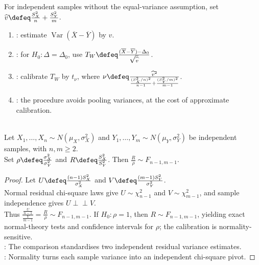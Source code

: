 \begin{method} \label{meth:welch-two-sample-test} \\
For independent samples without the equal-variance assumption, set $\widehat{v}\defeq \frac{S_X^2}{n}+\frac{S_Y^2}{m}$.
\begin{enumerate}[label=(\roman*)]
\setlength{\itemsep}{0pt}
\item {}: estimate $\operatorname{Var}(\overline{X}-\overline{Y})$ by $\widehat{v}$.
\item {}: for $H_0:\Delta=\Delta_0$, use $T_W\defeq\frac{(\overline{X}-\overline{Y})-\Delta_0}{\sqrt{\widehat{v}}}$.
\item {}: calibrate $T_W$ by $t_\nu$, where $\nu\defeq\frac{\widehat{v}^2}{\frac{(S_X^2/n)^2}{n-1}+\frac{(S_Y^2/m)^2}{m-1}}$.
\item {}: the procedure avoids pooling variances, at the cost of approximate calibration.
\end{enumerate}
\end{method}

\begin{corollary} \label{cor:two-normal-sample-variance-ratio-f} \\
Let $X_1,\ldots,X_n\sim N(\mu_X,\sigma_X^2)$ and $Y_1,\ldots,Y_m\sim N(\mu_Y,\sigma_Y^2)$ be independent samples, with $n,m\geq2$.\\
Set $\rho\defeq\frac{\sigma_X^2}{\sigma_Y^2}$ and $R\defeq \frac{S_X^2}{S_Y^2}$. Then $\frac{R}{\rho}\sim F_{n-1,m-1}$.
\begin{proof} Let $U\defeq\frac{(n-1)S_X^2}{\sigma_X^2}$ and $V\defeq\frac{(m-1)S_Y^2}{\sigma_Y^2}$.\\
Normal residual chi-square laws give $U\sim\chi^2_{n-1}$ and $V\sim\chi^2_{m-1}$, and sample independence gives $U\perp\!\!\!\perp V$.\\
Thus $\frac{\frac{U}{n-1}}{\frac{V}{m-1}}=\frac{R}{\rho}\sim F_{n-1,m-1}$. If $H_0:\rho=1$, then $R\sim F_{n-1,m-1}$, yielding exact normal-theory tests and confidence intervals for $\rho$; the calibration is normality-sensitive.\\
: The comparison standardises two independent residual variance estimates.\\
: Normality turns each sample variance into an independent chi-square pivot.
\end{proof}
\end{corollary}

